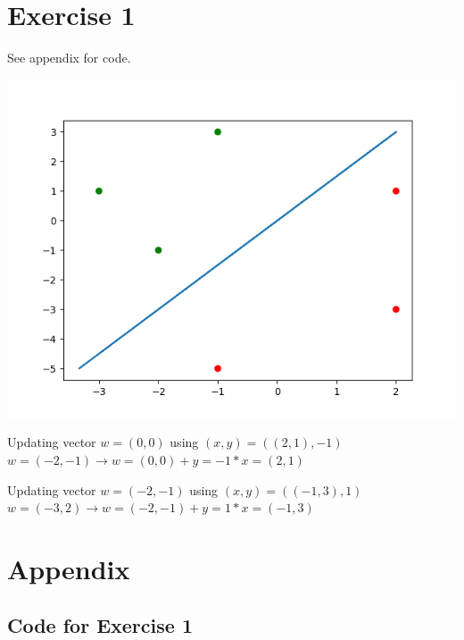 \documentclass[12pt]{article}
\begin{document}
\section*{Exercise 1}
See \refname{appendix} for code.
\begin{center}
	\includegraphics{code/perceptron.png}
\end{center}
Updating vector $w=(0, 0)$ using $(x,y)=((2, 1), -1)$ \\
$w=(-2, -1) \rightarrow w=(0, 0) + y=-1 * x=(2, 1)$ \\
\bigskip

Updating vector $w=(-2, -1)$ using $(x,y)=((-1, 3), 1)$ \\
$w=(-3, 2) \rightarrow w=(-2, -1) + y=1 * x=(-1, 3)$


\section*{Appendix}\label{appendix}
\subsection*{Code for Exercise 1}

\end{document}
